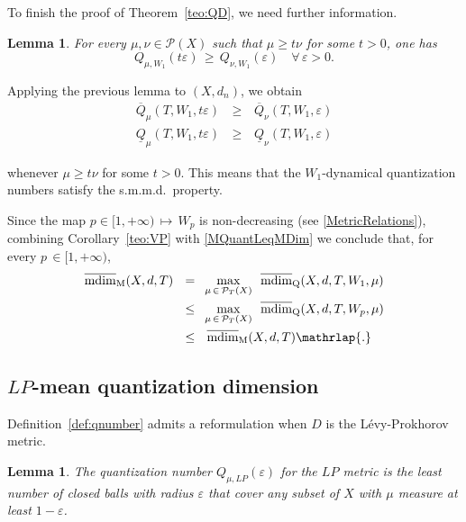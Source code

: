 \documentclass[11pt,a4paper,reqno]{amsart}
\theoremstyle{plain}
\newtheorem{lemma}[theorem]{Lemma}
\theoremstyle{definition}
\newcommand{\ep} {\varepsilon}
\newcommand{\vep}{\varepsilon}
\newcommand{\cP}{{\mathcal P}}
\begin{document}
\medskip

To finish the proof of Theorem~\ref{teo:QD}, we need further information.

\begin{lemma}\cite[Lemma 3.18]{BB}\label{def:MPQ}
For every $\mu, \nu \in \cP(X)$ such that $\mu \geq t\nu$ for some $t > 0$, one has
$$Q_{\mu,W_1}(t\ep)\, \geq\, Q_{\nu,W_1}(\ep) \quad \forall\, \vep>0.$$
\end{lemma}

\smallskip

Applying the previous lemma to $(X,d_n)$, we obtain \begin{eqnarray*}
    \overline{Q}_{\mu}(T,W_1,t\ep)\, &\geq&\, \overline{Q}_{\nu}(T,W_1,\ep)
    \\
     \underline{Q}_{\mu}(T,W_1,t\ep)\, &\geq&\, \underline{Q}_{\nu}(T,W_1,\ep)
\end{eqnarray*}

\noindent whenever $\mu \geq t\nu$ for some $t>0$. This means that the $W_1$-dynamical quantization numbers satisfy the s.m.m.d.~property.
\smallskip

Since the map $p\in[1, +\infty)\,\mapsto\,W_p$ is non-decreasing (see \eqref{MetricRelations}), combining Corollary~\ref{teo:VP} with \eqref{MQuantLeqMDim} we conclude that, for every $p\,\in[1, +\infty)$,
\begin{equation}
\begin{alignedat}{2}
\mathrm{\overline{mdim}_M}(X,d,T)\,\,\,\, 
&=\,\,\,\max_{\mu\,\in\,\cP_T(X)}\,\, \,\mathrm{\overline{mdim}_Q}(X,d,T,W_1,\mu) \\ 
& \leq\,\,\, \max_{\mu\,\in\,\cP_T(X)}\,\, \,\mathrm{\overline{mdim}_Q}(X,d,T,W_p,\mu) \\ 
& \leq\,\,\,\,\mathrm{\overline{mdim}_M}(X,d,T)
\mathrlap{.}
\end{alignedat}
\end{equation}

\smallskip

\subsection{$LP$-mean quantization dimension}

Definition~\ref{def:qnumber} admits a reformulation when $D$ is the L\'evy-Prokhorov metric.

\begin{lemma}\cite[Proposition 3.3]{BB} The quantization number $Q_{\mu,LP}(\ep)$ for the $LP$ metric is the least number of closed balls with radius $\vep$ that cover any subset of $X$ with $\mu$ measure at least $1-\vep$.
\end{lemma}
\end{document}
